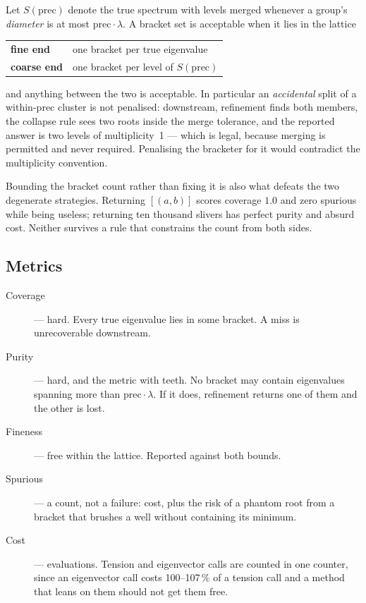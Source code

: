 \documentclass[11pt,a4paper]{article}
\newcommand{\pr}{\ensuremath{\mathrm{prec}}}
\newcommand{\lam}{\ensuremath{\lambda}}
\begin{document}
Let $S(\pr)$ denote the true spectrum with levels merged whenever a group's \emph{diameter}
is at most $\pr\!\cdot\!\lam$. A bracket set is acceptable when it lies in the lattice

\begin{center}
\begin{tabular}{ll}
\textbf{fine end} & one bracket per true eigenvalue \\
\textbf{coarse end} & one bracket per level of $S(\pr)$ \\
\end{tabular}
\end{center}

\noindent
and anything between the two is acceptable. In particular an \emph{accidental} split of a
within-$\pr$ cluster is not penalised: downstream, refinement finds both members, the
collapse rule sees two roots inside the merge tolerance, and the reported answer is two levels
of multiplicity~1 --- which is legal, because merging is permitted and never required.
Penalising the bracketer for it would contradict the multiplicity convention.

Bounding the bracket count rather than fixing it is also what defeats the two degenerate
strategies. Returning $[(a,b)]$ scores coverage $1.0$ and zero spurious while being useless;
returning ten thousand slivers has perfect purity and absurd cost. Neither survives a rule that
constrains the count from both sides.

\subsection{Metrics}

\begin{description}
\item[Coverage] --- hard. Every true eigenvalue lies in some bracket. A miss is unrecoverable
downstream.
\item[Purity] --- hard, and the metric with teeth. No bracket may contain eigenvalues spanning
more than $\pr\!\cdot\!\lam$. If it does, refinement returns one of them and the other is
lost.
\item[Fineness] --- free within the lattice. Reported against both bounds.
\item[Spurious] --- a count, not a failure: cost, plus the risk of a phantom root from a bracket
that brushes a well without containing its minimum.
\item[Cost] --- evaluations. Tension and eigenvector calls are counted in one counter, since an
eigenvector call costs 100--107\,\% of a tension call and a method that leans on them should
not get them free.
\end{description}
\end{document}

